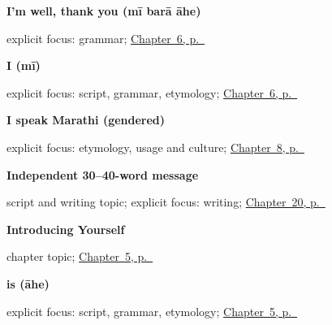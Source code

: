 \noindent\begin{minipage}[t]{\linewidth}
\raggedright
\textbf{I'm well, thank you (mī barā āhe)}\enspace\emph{  }\par
\footnotesize explicit focus: grammar; \hyperref[ch:responding]{Chapter~6, p.~\pageref*{ch:responding}}
\end{minipage}\par\smallskip

\noindent\begin{minipage}[t]{\linewidth}
\raggedright
\textbf{I (mī)}\enspace\emph{}\par
\footnotesize explicit focus: script, grammar, etymology; \hyperref[ch:responding]{Chapter~6, p.~\pageref*{ch:responding}}
\end{minipage}\par\smallskip

\noindent\begin{minipage}[t]{\linewidth}
\raggedright
\textbf{I speak Marathi (gendered)}\enspace\emph{  }\par
\footnotesize explicit focus: etymology, usage and culture; \hyperref[ch:first-verbs]{Chapter~8, p.~\pageref*{ch:first-verbs}}
\end{minipage}\par\smallskip

\noindent\begin{minipage}[t]{\linewidth}
\raggedright
\textbf{Independent 30–40-word message}\par
\footnotesize script and writing topic; explicit focus: writing; \hyperref[ch:mr-a1-named-reader-message]{Chapter~20, p.~\pageref*{ch:mr-a1-named-reader-message}}
\end{minipage}\par\smallskip

\noindent\begin{minipage}[t]{\linewidth}
\raggedright
\textbf{Introducing Yourself}\par
\footnotesize chapter topic; \hyperref[ch:introductions]{Chapter~5, p.~\pageref*{ch:introductions}}
\end{minipage}\par\smallskip

\noindent\begin{minipage}[t]{\linewidth}
\raggedright
\textbf{is (āhe)}\enspace\emph{}\par
\footnotesize explicit focus: script, grammar, etymology; \hyperref[ch:introductions]{Chapter~5, p.~\pageref*{ch:introductions}}
\end{minipage}\par\smallskip

